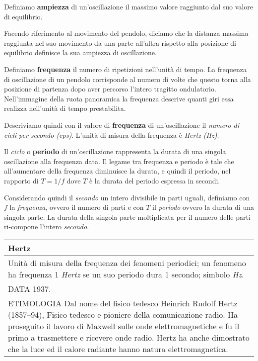 Definiamo \textbf{ampiezza} di un'oscillazione il massimo valore raggiunto
dal suo valore di equilibrio.

Facendo riferimento al movimento del pendolo, diciamo che la distanza massima
raggiunta nel suo movimento da una parte all'altra rispetto alla posizione di
equilibrio definisce la sua ampiezza di oscillazione.



Definiamo \textbf{frequenza} il numero di ripetizioni nell'unità di tempo. La
frequenza di oscillazione di un pendolo corrisponde al numero di volte che questo
torna alla posizione di partenza dopo aver percorso l'intero tragitto ondulatorio.
Nell'immagine della ruota panoramica la frequenza descrive quanti giri essa realizza
nell'unità di tempo prestabilita.

Descriviamo quindi con il valore di \textbf{frequenza} di un'oscillazione il
\emph{numero di cicli per secondo (cps)}. L'unità di misura della frequenza è
\emph{Hertz (Hz)}.



Il \emph{ciclo} o \textbf{periodo} di un'oscillazione rappresenta la durata di
una singola oscillazione alla frequenza data.
Il legame tra frequenza e periodo è tale che all'aumentare della frequenza
diminuisce la durata, e quindi il periodo, nel rapporto di $ T = 1/f $ dove
$ T $ è la durata del periodo espressa in secondi.

Considerando quindi il \emph{secondo} un intero divisibile in parti uguali,
definiamo con $ f $ la \emph{frequenza}, ovvero il numero di parti e con $ T $
il \emph{periodo} ovvero la durata di una singola parte. La durata della
singola parte moltiplicata per il numero delle parti ri-compone l'intero \emph{secondo}.

\bigskip

		\begin{tabular}{L{.969\textwidth}}%
		\toprule
			\textbf{Hertz}\\
		\midrule
			Unità di misura della frequenza dei fenomeni periodici; un fenomeno ha
			frequenza 1 \emph{Hertz} se un suo periodo dura 1 secondo; simbolo
			\emph{Hz}.\\

			DATA 1937.\\

			ETIMOLOGIA Dal nome del fisico tedesco Heinrich Rudolf Hertz (1857–94),
			Fisico tedesco e pioniere della comunicazione radio. Ha proseguito il
			lavoro di Maxwell sulle onde elettromagnetiche e fu il primo a trasmettere
			e ricevere onde radio. Hertz ha anche dimostrato che la luce ed il calore
			radiante hanno natura elettromagnetica. \\
		\bottomrule
		\end{tabular}

